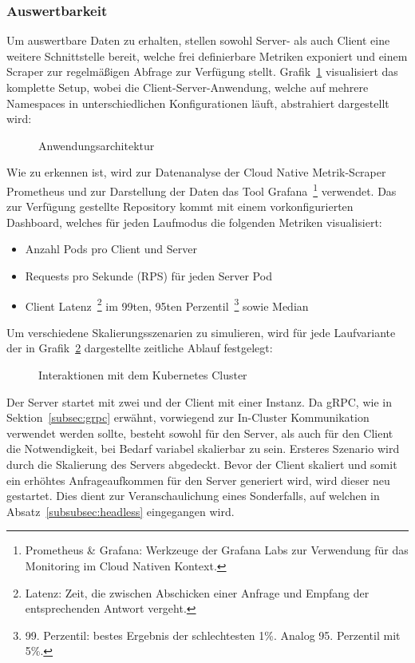 \subsubsection{Auswertbarkeit}\label{subsubsec:auswertbarkeit}
Um auswertbare Daten zu erhalten, stellen sowohl Server- als auch Client eine weitere Schnittstelle bereit, welche frei definierbare Metriken exponiert und einem Scraper zur regelmäßigen Abfrage zur Verfügung stellt.
Grafik~\ref{fig:setup} visualisiert das komplette Setup, wobei die Client-Server-Anwendung, welche auf mehrere Namespaces in unterschiedlichen Konfigurationen läuft, abstrahiert dargestellt wird:

\begin{figure}[H]
    \centering
    
    \caption{Anwendungsarchitektur}
    \label{fig:setup}
\end{figure}

Wie zu erkennen ist, wird zur Datenanalyse der Cloud Native Metrik-Scraper Prometheus und zur Darstellung der Daten das Tool Grafana~\footnote{Prometheus \& Grafana: Werkzeuge der Grafana Labs zur Verwendung für das Monitoring im Cloud Nativen Kontext.} verwendet.
Das zur Verfügung gestellte Repository kommt mit einem vorkonfigurierten Dashboard, welches für jeden Laufmodus die folgenden Metriken visualisiert:
\begin{itemize}
    \item Anzahl Pods pro Client und Server
    \item Requests pro Sekunde (RPS) für jeden Server Pod
    \item Client Latenz~\footnote{Latenz: Zeit, die zwischen Abschicken einer Anfrage und Empfang der entsprechenden Antwort vergeht.} im 99ten, 95ten Perzentil~\footnote{99. Perzentil: bestes Ergebnis der schlechtesten 1\%. Analog 95. Perzentil mit 5\%.} sowie Median
\end{itemize}

Um verschiedene Skalierungsszenarien zu simulieren, wird für jede Laufvariante der in Grafik~\ref{fig:zeitablauf} dargestellte zeitliche Ablauf festgelegt:

\begin{figure}[H]
    \centering
    
    \caption{Interaktionen mit dem Kubernetes Cluster}
    \label{fig:zeitablauf}
\end{figure}

Der Server startet mit zwei und der Client mit einer Instanz.
Da gRPC, wie in Sektion~\ref{subsec:grpc} erwähnt, vorwiegend zur In-Cluster Kommunikation verwendet werden sollte, besteht sowohl für den Server, als auch für den Client die Notwendigkeit, bei Bedarf variabel skalierbar zu sein.
Ersteres Szenario wird durch die Skalierung des Servers abgedeckt.
Bevor der Client skaliert und somit ein erhöhtes Anfrageaufkommen für den Server generiert wird, wird dieser neu gestartet.
Dies dient zur Veranschaulichung eines Sonderfalls, auf welchen in Absatz~\ref{subsubsec:headless} eingegangen wird.

